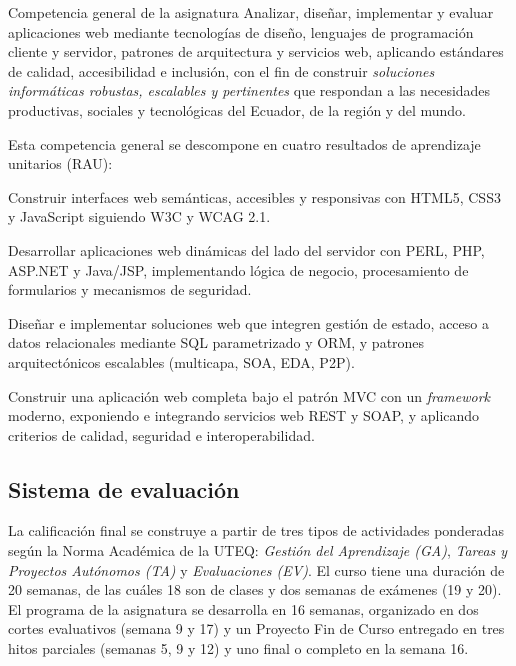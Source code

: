 \begin{cajadefinicion}{Competencia general de la asignatura}
Analizar, diseñar, implementar y evaluar aplicaciones web mediante
tecnologías de diseño, lenguajes de programación cliente y servidor,
patrones de arquitectura y servicios web, aplicando estándares de
calidad, accesibilidad e inclusión, con el fin de construir
\emph{soluciones informáticas robustas, escalables y pertinentes} que
respondan a las necesidades productivas, sociales y tecnológicas del
Ecuador, de la región y del mundo.
\end{cajadefinicion}

Esta competencia general se descompone en cuatro resultados de
aprendizaje unitarios (RAU):

\begin{description}[leftmargin=1.5cm]
\item[RAU 1.] Construir interfaces web semánticas, accesibles y
responsivas con HTML5, CSS3 y JavaScript siguiendo W3C y WCAG 2.1.
\item[RAU 2.] Desarrollar aplicaciones web dinámicas del lado del
servidor con PERL, PHP, ASP.NET y Java/JSP, implementando lógica de
negocio, procesamiento de formularios y mecanismos de seguridad.
\item[RAU 3.] Diseñar e implementar soluciones web que integren gestión
de estado, acceso a datos relacionales mediante SQL parametrizado y
ORM, y patrones arquitectónicos escalables (multicapa, SOA, EDA, P2P).
\item[RAU 4.] Construir una aplicación web completa bajo el patrón MVC
con un \emph{framework} moderno, exponiendo e integrando servicios web
REST y SOAP, y aplicando criterios de calidad, seguridad e
interoperabilidad.
\end{description}

\subsection{Sistema de evaluación}

La calificación final se construye a partir de tres tipos de  actividades ponderadas según la Norma Académica de la UTEQ:
\emph{Gestión del Aprendizaje (GA)}, \emph{Tareas y Proyectos Autónomos (TA)} y \emph{Evaluaciones (EV)}. El curso tiene una duración de 20 semanas, de las cuáles 18 son de clases y dos semanas de exámenes (19 y 20). El programa de la asignatura se desarrolla en 16 semanas, organizado en dos cortes evaluativos (semana 9 y 17) y un Proyecto Fin de Curso entregado en tres hitos parciales (semanas 5, 9 y 12) y uno final o completo en la semana 16.

